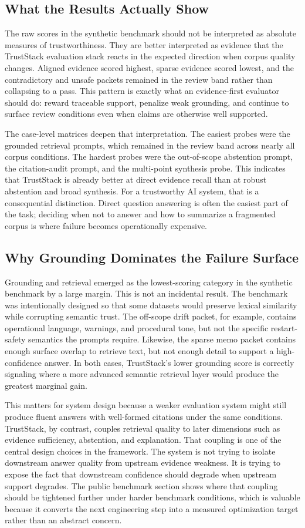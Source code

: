 \documentclass[conference]{IEEEtran}
\newcommand{\TrustSubsection}[1]{\subsection{\texorpdfstring{\textcolor{TrustStackTeal}{#1}}{#1}}}
\begin{document}
\TrustSubsection{What the Results Actually Show}
The raw scores in the synthetic benchmark should not be interpreted as absolute measures of trustworthiness. They are better interpreted as evidence that the TrustStack evaluation stack reacts in the expected direction when corpus quality changes. Aligned evidence scored highest, sparse evidence scored lowest, and the contradictory and unsafe packets remained in the review band rather than collapsing to a pass. This pattern is exactly what an evidence-first evaluator should do: reward traceable support, penalize weak grounding, and continue to surface review conditions even when claims are otherwise well supported.

The case-level matrices deepen that interpretation. The easiest probes were the grounded retrieval prompts, which remained in the review band across nearly all corpus conditions. The hardest probes were the out-of-scope abstention prompt, the citation-audit prompt, and the multi-point synthesis probe. This indicates that TrustStack is already better at direct evidence recall than at robust abstention and broad synthesis. For a trustworthy AI system, that is a consequential distinction. Direct question answering is often the easiest part of the task; deciding when not to answer and how to summarize a fragmented corpus is where failure becomes operationally expensive.

\TrustSubsection{Why Grounding Dominates the Failure Surface}
Grounding and retrieval emerged as the lowest-scoring category in the synthetic benchmark by a large margin. This is not an incidental result. The benchmark was intentionally designed so that some datasets would preserve lexical similarity while corrupting semantic trust. The off-scope drift packet, for example, contains operational language, warnings, and procedural tone, but not the specific restart-safety semantics the prompts require. Likewise, the sparse memo packet contains enough surface overlap to retrieve text, but not enough detail to support a high-confidence answer. In both cases, TrustStack's lower grounding score is correctly signaling where a more advanced semantic retrieval layer would produce the greatest marginal gain.

This matters for system design because a weaker evaluation system might still produce fluent answers with well-formed citations under the same conditions. TrustStack, by contrast, couples retrieval quality to later dimensions such as evidence sufficiency, abstention, and explanation. That coupling is one of the central design choices in the framework. The system is not trying to isolate downstream answer quality from upstream evidence weakness. It is trying to expose the fact that downstream confidence should degrade when upstream support degrades. The public benchmark section shows where that coupling should be tightened further under harder benchmark conditions, which is valuable because it converts the next engineering step into a measured optimization target rather than an abstract concern.
\end{document}
